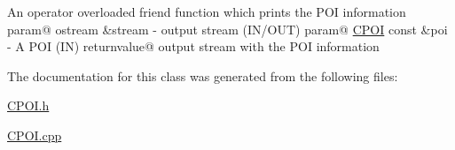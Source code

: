 An operator overloaded friend function which prints the P\+OI information param@ ostream \&stream -\/ output stream (I\+N/\+O\+UT) param@ \hyperlink{classCPOI}{C\+P\+OI} const \&poi -\/ A P\+OI (IN) returnvalue@ output stream with the P\+OI information 

The documentation for this class was generated from the following files\+:\begin{DoxyCompactItemize}
\item 
\hyperlink{CPOI_8h}{C\+P\+O\+I.\+h}\item 
\hyperlink{CPOI_8cpp}{C\+P\+O\+I.\+cpp}\end{DoxyCompactItemize}
